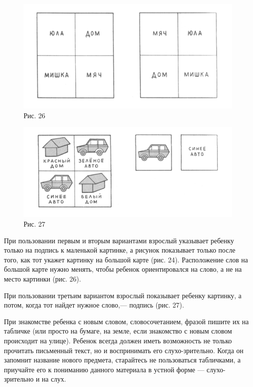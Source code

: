 \documentclass{book}
\begin{document}
\begin{figure}
\centering
\includegraphics[width=\linewidth]{media/media/image23.png}
\caption*{Рис. 26}
\end{figure}

\begin{figure}
\centering
\includegraphics[width=\linewidth]{media/media/image24.png}
\caption*{Рис. 27}
\end{figure}

При пользовании первым и вторым вариантами взрослый указывает ребенку
только на подпись к маленькой картинке, а рисунок показывает только
после того, как тот укажет картинку на большой карте (рис. 24).
Расположение слов на большой карте нужно менять, чтобы ребенок
ориентировался на слово, а не на место картинки (рис. 26).

При пользовании третьим вариантом взрослый показывает ребенку картинку,
а потом, когда тот найдет нужное слово,--- подпись (рис. 27).

При знакомстве ребенка с новым словом, словосочетанием, фразой пишите их
на табличке (или просто на бумаге, на земле, если знакомство с новым
словом происходит на улице). Ребенок всегда должен иметь возможность не
только прочитать письменный текст, но и воспринимать его
слухо-зрительно. Когда он запомнит название нового предмета, старайтесь
не пользоваться табличками, а приучайте его к пониманию данного
материала в устной форме --- слухо-зрительно и на слух.
\end{document}
